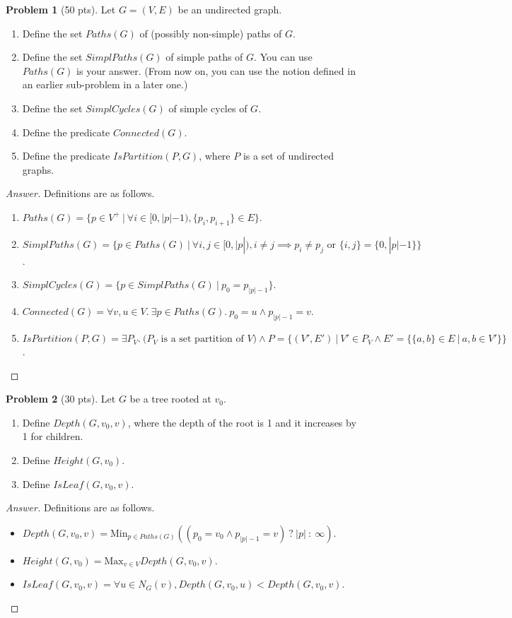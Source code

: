 \documentclass[11pt,a4paper,oneside,microtype,nokorean]{oblivoir}
\theoremstyle{definition}
\newtheorem{problem}{Problem}
\begin{document}
\begin{problem}[50 pts]
  Let $G = (V,E)$ be an undirected graph.

  \begin{enumerate}
  \item Define the set $Paths(G)$ of (possibly non-simple) paths of $G$.
  \item Define the set $SimplPaths(G)$ of simple paths of $G$.  You can use $Paths(G)$ is your
    answer.  (From now on, you can use the notion defined in an earlier sub-problem in a later one.)
  \item Define the set $SimplCycles(G)$ of simple cycles of $G$.
  \item Define the predicate $Connected(G)$.
  \item Define the predicate $IsPartition(P, G)$, where $P$ is a set of undirected graphs.
  \end{enumerate}
\end{problem}
\begin{proof}[Answer]
  Definitions are as follows.
  \begin{enumerate}
  \item $Paths(G) = \{p \in V^+~|~\forall i \in [0,|p|-1), \{p_i,p_{i+1}\} \in E \}$.
  \item
    $SimplPaths(G) = \{p \in Paths(G)~|~ \forall i,j \in [0,|p|), i \neq j \implies p_i \neq p_j
    \mbox{~or~} \{i,j\} = \{0,|p|-1\} \}$.
  \item $SimplCycles(G) = \{p \in SimplPaths(G)~|~ p_0 = p_{|p|-1} \}$.
  \item $Connected(G) = \forall v,u \in V.~\exists p \in Paths(G).~p_0 = u \land p_{|p|-1} = v$.
  \item $IsPartition(P,G) = \exists P_V.~\mbox{($P_V$ is a set partition of $V$)} \land P = \{(V',E')~|~V' \in P_V \land E' = \{\{a,b\} \in E~|~a,b \in V'\}\}$.
  \end{enumerate}
\end{proof}


\begin{problem}[30 pts]
  Let $G$ be a tree rooted at $v_0$.

  \begin{enumerate}
  \item Define $Depth(G, v_0, v)$, where the depth of the root is 1 and it increases by 1 for
    children.
  \item Define $Height(G, v_0)$.
  \item Define $IsLeaf(G, v_0, v)$.
  \end{enumerate}
\end{problem}
\begin{proof}[Answer]
  Definitions are as follows.
  \begin{itemize}
  \item $Depth(G,v_0,v) = \mbox{Min}_{p \in Paths(G)} ((p_0 = v_0 \land p_{|p|-1} = v)~?~|p|~:~\infty)$.
  \item $Height(G,v_0) = \mbox{Max}_{v \in V} Depth(G,v_0,v)$.
  \item $IsLeaf(G,v_0,v) = \forall u \in N_G(v), Depth(G,v_0,u) < Depth(G,v_0,v)$.
  \end{itemize}
\end{proof}
\end{document}
